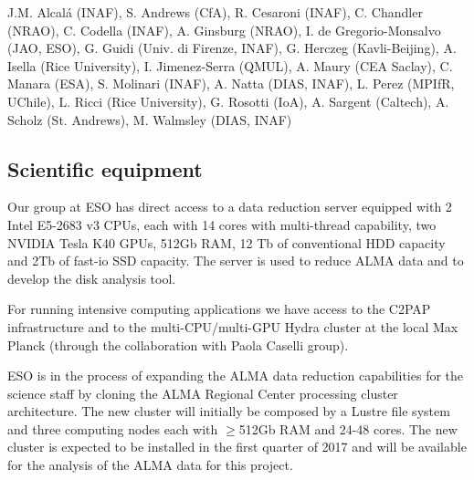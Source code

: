 \documentclass[10pt,fleqn,twoside]{article}
\begin{document}
J.M. Alcal\'a (INAF), S. Andrews (CfA), R. Cesaroni (INAF), C. Chandler (NRAO), C. Codella (INAF), A. Ginsburg (NRAO), I. de Gregorio-Monsalvo (JAO, ESO), G. Guidi (Univ. di Firenze, INAF), G. Herczeg (Kavli-Beijing), A. Isella (Rice University), I. Jimenez-Serra (QMUL), A. Maury (CEA Saclay), C. Manara (ESA), S. Molinari (INAF), A. Natta (DIAS, INAF), L. Perez (MPIfR, UChile), L. Ricci (Rice University), G. Rosotti (IoA), A. Sargent (Caltech), A. Scholz (St. Andrews), M. Walmsley (DIAS, INAF)

\subsection{Scientific equipment}

Our group at ESO has direct access to a data reduction server
equipped with 2 Intel E5-2683 v3 CPUs, each with 14 cores with multi-thread capability, two
NVIDIA Tesla K40 GPUs, 512Gb RAM,
12 Tb of conventional HDD capacity and 2Tb of fast-io SSD capacity.
The server is used to reduce ALMA data and to develop the disk analysis tool.

For running intensive computing applications we have access to the C2PAP 
infrastructure and to the multi-CPU/multi-GPU Hydra cluster at the
local Max Planck (through the collaboration with Paola Caselli group).

ESO is in the process of expanding the ALMA data reduction capabilities for 
the science staff by
cloning the ALMA Regional Center processing cluster architecture. The new
cluster will initially be composed by a Lustre file system and three computing 
nodes each with $\ge$512Gb RAM and 24-48 cores. The new cluster is expected to be installed 
in the first quarter of 2017 and will be available 
for the analysis of the ALMA data for this project.





\end{document}
